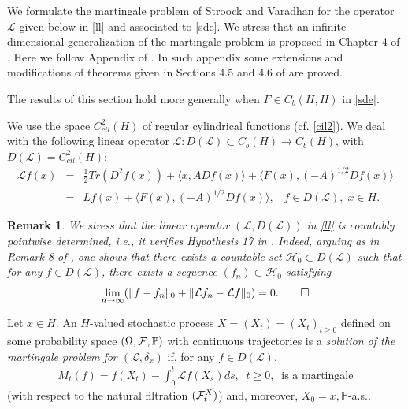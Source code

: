 \documentclass[preprint]{imsart}
\newtheorem{remark}[theorem]{Remark}
\def\P{\mathbb P}
\def\L{\mathcal L}
\begin{document}
 We  formulate the martingale problem of Stroock and Varadhan \cite{SV79} for the operator $\L$ given below in \eqref{ll} and associated to \eqref{sde}. We stress that  an infinite-dimensional generalization of the martingale problem is proposed in Chapter 4 of \cite{EK}.  Here we follow 
   Appendix of \cite{PrPot}.  In such  appendix  some extensions and modifications of theorems given in
Sections 4.5 and 4.6 of \cite{EK} are proved. 

The results of this section hold more generally when $F \in C_b(H,H)$ in \eqref{sde}.

 \vskip 1mm       
   We use the space $C^2_{cil}(H)$
  of regular
  cylindrical functions (cf. \eqref{cil2}).
  We 
 deal with the following linear operator ${\L}: D(\L) \subset C_b(H) \to C_b(H)$,
with $D(\L) = C^2_{cil}(H)$:   
 \begin{eqnarray} \label{ll}
\L f (x) &=& \frac{1}{2} Tr(D^2 f(x)) + \langle x, ADf(x) \rangle +
\langle F(x),  (-A)^{1/2} Df(x) \rangle 
\\ \nonumber & = &
L f (x) +  
\langle F(x),  (-A)^{1/2} Df(x) \rangle,\;\;\; f \in D(\L),\; x \in H.
\end{eqnarray}

 
   
\begin{remark} {\em   
 We stress  that the linear operator $(\L, D(\L ))$  in \eqref{ll} is countably pointwise determined,
   i.e., it verifies Hypothesis 17 in \cite{PrPot}. Indeed, arguing  as in Remark 8 of \cite{PrPot}, one shows that there exists  a countable
set ${\mathcal H}_0 \subset D(\L)$ such
 that for any $f \in D(\L) $, there exists 
a sequence $(f_n) \subset {\mathcal H}_0$ satisfying
$$
 \lim_{n \to \infty} ( \| f - f_n \|_{0} +   \|  \L f_n -   \L f \|_{0}) =0. \qed
$$ 
}
\end{remark}

Let $x \in H$. An $H$-valued stochastic process $X = (X_t)= (X_t)_{  t \ge 0 }$
defined on some probability space $(\Omega, {\cal F}, \P)$
with continuous trajectories is a \textsl { solution of the martingale
problem for $(\L, \delta_x)$} if,
 for any $f \in D(\L)$,
\begin{equation}\label{mart}
 \begin{array}{l}
    M_t(f) = f(X_t) - \int_0^t \L f(X_s) ds, \;\; t \ge 0, \;\; \text{is a
    martingale}
\end{array} 
    \end{equation}
(with respect to the natural filtration $({\cal F}_t^X)$) 
  and, moreover,     $X_0 =x, \P$-a.s.. 
  
\end{document}
